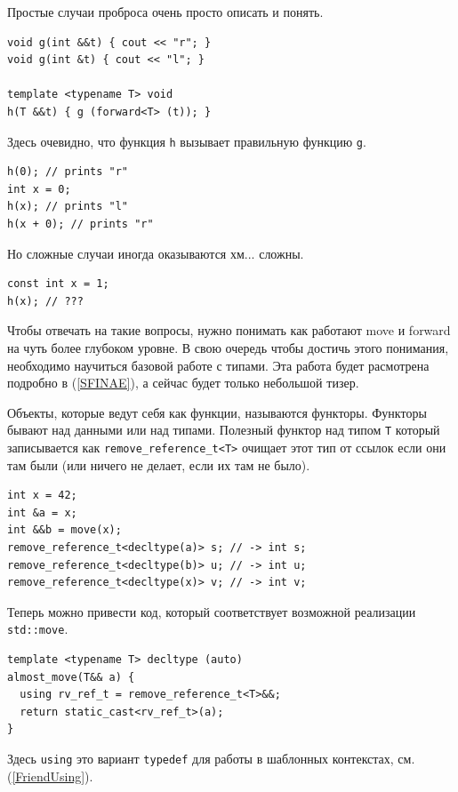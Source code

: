 \documentclass[a4paper,12pt,oneside]{article}
\begin{document}
Простые случаи проброса очень просто описать и понять.

\begin{lstlisting}
void g(int &&t) { cout << "r"; }
void g(int &t) { cout << "l"; }

template <typename T> void 
h(T &&t) { g (forward<T> (t)); }
\end{lstlisting}

Здесь очевидно, что функция \lstinline!h! вызывает правильную функцию \lstinline!g!.

\begin{lstlisting}
h(0); // prints "r"
int x = 0; 
h(x); // prints "l"
h(x + 0); // prints "r"
\end{lstlisting}

Но сложные случаи иногда оказываются хм... сложны.

\begin{lstlisting}
const int x = 1;
h(x); // ???
\end{lstlisting}

Чтобы отвечать на такие вопросы, нужно понимать как работают move и forward на чуть более глубоком уровне. В свою очередь чтобы достичь этого понимания, необходимо научиться базовой работе с типами. Эта работа будет расмотрена подробно в (\ref{SFINAE}), а сейчас будет только небольшой тизер.

Объекты, которые ведут себя как функции, называются функторы. Функторы бывают над данными или над типами. Полезный функтор над типом \lstinline!T! который записывается как \lstinline!remove_reference_t<T>! очищает этот тип от ссылок если они там были (или ничего не делает, если их там не было).

\begin{lstlisting}
int x = 42;
int &a = x;
int &&b = move(x);
remove_reference_t<decltype(a)> s; // -> int s;
remove_reference_t<decltype(b)> u; // -> int u;
remove_reference_t<decltype(x)> v; // -> int v;
\end{lstlisting}

Теперь можно привести код, который соответствует возможной реализации \lstinline!std::move!.

\begin{lstlisting}
template <typename T> decltype (auto)
almost_move(T&& a) {
  using rv_ref_t = remove_reference_t<T>&&;
  return static_cast<rv_ref_t>(a);
} 
\end{lstlisting}

Здесь \lstinline!using! это вариант \lstinline!typedef! для работы в шаблонных контекстах, см. (\ref{FriendUsing}).
\end{document}
